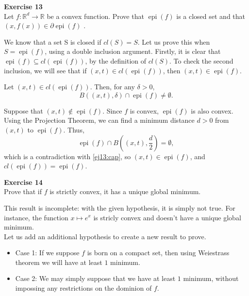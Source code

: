 \documentclass[11pt,table]{article}
\newenvironment{problem}[2][Exercise]
{ \begin{mdframed}[backgroundcolor=gray!20] \textbf{#1 #2} \\}
	{  \end{mdframed}}
\begin{document}
\begin{problem}{13}
Let \( f : \mathbb{R}^d \to \mathbb{R} \) be a convex function. Prove that \( \operatorname{epi}(f) \) is a closed set and that \( (x, f(x)) \in \partial \operatorname{epi}(f) \)  .
\end{problem}

We know that a set S is closed if \(cl(S) = S\). Let us prove this when \(S = \operatorname{epi}(f)\), using a double inclusion argument. Firstly, it is clear that $\operatorname{epi}(f) \subseteq cl(\operatorname{epi}(f))$, by the definition of \(cl(S)\). To check the second inclusion, we will see that if \((x,t)\in cl(\operatorname{epi}(f))\), then \((x,t) \in \operatorname{epi}(f)\).

Let \((x,t)\in cl(\operatorname{epi}(f))\). Then, for any \(\delta > 0\),
\begin{equation}\label{ej13:cap}
	B((x,t),\delta) \cap 	\operatorname{epi}(f) \neq \emptyset.
\end{equation}

Suppose that \((x,t)\notin \operatorname{epi}(f)\). Since \(f\) is convex, \(\operatorname{epi}(f)\) is also convex. Using the Projection Theorem, we can find a minimum distance \(d > 0\) from \((x,t)\) to \(\operatorname{epi}(f)\). Thus,
\[
	\operatorname{epi}(f) \cap B((x,t), \frac{d}{2}) = \emptyset,
\]
which is a contradiction with \eqref{ej13:cap}, so \((x,t) \in \operatorname{epi}(f)\), and \(cl(\operatorname{epi}(f)) = \operatorname{epi}(f)\).


\begin{problem}{14}
Prove that if \( f \)  is strictly convex, it has a unique global minimum.
\end{problem}

This result is incomplete: with the given hypothesis, it is simply not true. For instance, the function $x \mapsto e^x$ is stricly convex and doesn't have a unique global minimum. \\

Let us add an additional hypothesis to create a new result to prove.

\begin{itemize}
	\item Case 1: If we suppose $f$ is born on a compact set, then using Weiestrass theorem we will have at least $1$ minimum.
	\item Case 2: We may simply suppose that we have at least $1$ minimum, without impossing any restrictions on the dominion of $f$.
\end{itemize}
\end{document}

